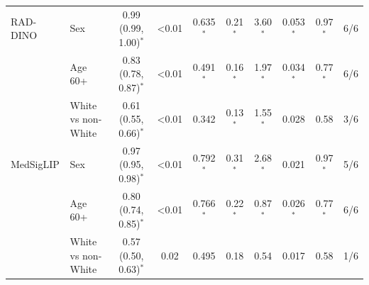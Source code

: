 \begin{tabular}{llcccccccc}
\midrule
RAD-DINO & Sex & 0.99 (0.99, 1.00)$^{*}$ & <0.01 & 0.635$^{*}$ & 0.21$^{*}$ & 3.60$^{*}$ & 0.053$^{*}$ & 0.97$^{*}$ & 6/6 \\
 & Age 60+ & 0.83 (0.78, 0.87)$^{*}$ & <0.01 & 0.491$^{*}$ & 0.16$^{*}$ & 1.97$^{*}$ & 0.034$^{*}$ & 0.77$^{*}$ & 6/6 \\
 & White vs non-White & 0.61 (0.55, 0.66)$^{*}$ & <0.01 & 0.342 & 0.13$^{*}$ & 1.55$^{*}$ & 0.028 & 0.58 & 3/6 \\
\midrule
MedSigLIP & Sex & 0.97 (0.95, 0.98)$^{*}$ & <0.01 & 0.792$^{*}$ & 0.31$^{*}$ & 2.68$^{*}$ & 0.021 & 0.97$^{*}$ & 5/6 \\
 & Age 60+ & 0.80 (0.74, 0.85)$^{*}$ & <0.01 & 0.766$^{*}$ & 0.22$^{*}$ & 0.87$^{*}$ & 0.026$^{*}$ & 0.77$^{*}$ & 6/6 \\
 & White vs non-White & 0.57 (0.50, 0.63)$^{*}$ & 0.02 & 0.495 & 0.18 & 0.54 & 0.017 & 0.58 & 1/6 \\
\bottomrule
\end{tabular}
